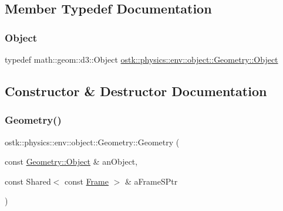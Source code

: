 \subsection{Member Typedef Documentation}
\mbox{\label{classostk_1_1physics_1_1env_1_1object_1_1_geometry_abeade8931056612deaa868abdaac8c9c}} 
\subsubsection{\texorpdfstring{Object}{Object}}
{\footnotesize\ttfamily typedef math\+::geom\+::d3\+::\+Object \hyperlink{classostk_1_1physics_1_1env_1_1object_1_1_geometry_abeade8931056612deaa868abdaac8c9c}{ostk\+::physics\+::env\+::object\+::\+Geometry\+::\+Object}}



\subsection{Constructor \& Destructor Documentation}
\mbox{\label{classostk_1_1physics_1_1env_1_1object_1_1_geometry_a99cd68601f35dd7c24bb7e441728b65a}} 
\subsubsection{\texorpdfstring{Geometry()}{Geometry()}\hspace{0.1cm}{\footnotesize\ttfamily [1/3]}}
{\footnotesize\ttfamily ostk\+::physics\+::env\+::object\+::\+Geometry\+::\+Geometry (\begin{DoxyParamCaption}\item[{const \hyperlink{classostk_1_1physics_1_1env_1_1object_1_1_geometry_abeade8931056612deaa868abdaac8c9c}{Geometry\+::\+Object} \&}]{an\+Object,  }\item[{const Shared$<$ const \hyperlink{classostk_1_1physics_1_1coord_1_1_frame}{Frame} $>$ \&}]{a\+Frame\+S\+Ptr }\end{DoxyParamCaption})}




